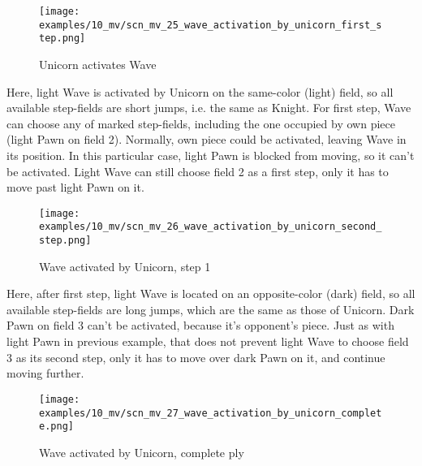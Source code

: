 \clearpage %

\vspace*{-2.1\baselineskip}
\noindent
\begin{figure}[!h]
\texttt{[image: examples/10\_mv/scn\_mv\_25\_wave\_activation\_by\_unicorn\_first\_step.png]}
\vspace*{-1.3\baselineskip}
\caption{Unicorn activates Wave}
\label{fig:scn_mv_25_wave_activation_by_unicorn_first_step}
\end{figure}

\vspace*{-0.3\baselineskip}
Here, light Wave is activated by Unicorn on the same-color (light) field, so all available
step-fields are short jumps, i.e. the same as Knight. For first step, Wave can choose any of
marked step-fields, including the one occupied by own piece (light Pawn on field 2). Normally,
own piece could be activated, leaving Wave in its position. In this particular case, light Pawn
is blocked from moving, so it can't be activated. Light Wave can still choose field 2 as a first
step, only it has to move past light Pawn on it.

\clearpage %

\vspace*{-2.1\baselineskip}
\noindent
\begin{figure}[!h]
\texttt{[image: examples/10\_mv/scn\_mv\_26\_wave\_activation\_by\_unicorn\_second\_step.png]}
\caption{Wave activated by Unicorn, step 1}
\label{fig:scn_mv_26_wave_activation_by_unicorn_second_step}
\end{figure}

Here, after first step, light Wave is located on an opposite-color (dark) field, so all available
step-fields are long jumps, which are the same as those of Unicorn. Dark Pawn on field 3 can't be
activated, because it's opponent's piece. Just as with light Pawn in previous example, that does
not prevent light Wave to choose field 3 as its second step, only it has to move over dark Pawn
on it, and continue moving further.

\clearpage %

\vspace*{-2.1\baselineskip}
\noindent
\begin{figure}[!h]
\texttt{[image: examples/10\_mv/scn\_mv\_27\_wave\_activation\_by\_unicorn\_complete.png]}
\caption{Wave activated by Unicorn, complete ply}
\label{fig:scn_mv_27_wave_activation_by_unicorn_complete}
\end{figure}

